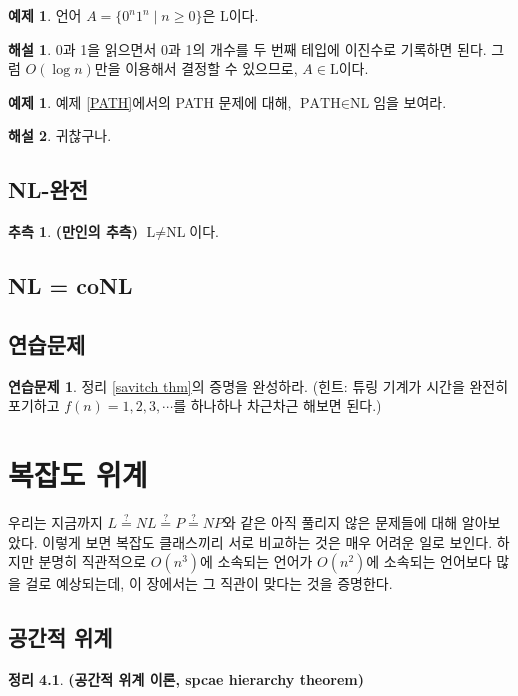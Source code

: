 \documentclass[b5paper, 11pt]{book}
\theoremstyle{definition}
\newtheorem{thm}[defn]{정리}
\newtheorem{ex}[defn]{예제}
\newtheorem{ec}{연습문제}[chapter]
\newtheorem{conj}[defn]{추측}
\newtheorem*{ans*}{해설}
\newenvironment{pf*}{\pushQED{\qed}\pf}
{\popQED\endpf}
\begin{document}
\begin{ex}
    언어 $A = \{ 0^n 1^n \;\vert\; n \ge 0\}$은 L이다.
\end{ex} 
\begin{ans*}
    0과 1을 읽으면서 0과 1의 개수를 두 번째 테입에 이진수로 기록하면 된다. 그럼 $O(\log{n})$만을 이용해서 결정할 수 있으므로, $A \in \text{L}$이다.
\end{ans*}
\begin{ex}
    예제 \ref{PATH}에서의 PATH 문제에 대해, $\text{PATH} \in \text{NL}$임을 보여라.
\end{ex}
\begin{ans*}
    귀찮구나.
\end{ans*}
\section{NL-완전}
\begin{conj}
    \textbf{(만인의 추측)} $\text{L} \neq \text{NL}$이다.
\end{conj}
\section{NL = coNL}
\section{연습문제}
\begin{ec}\label{savitch thm exec}
    정리 \ref{savitch thm}의 증명을 완성하라. (힌트: 튜링 기계가 시간을 완전히 포기하고 $f(n) = 1, 2, 3, \cdots$를 하나하나 차근차근 해보면 된다.)
\end{ec}
\chapter{복잡도 위계}
우리는 지금까지 $L \overset{?}{=} NL \overset{?}{=} P \overset{?}{=} NP$와 같은 아직 풀리지 않은 문제들에 대해 알아보았다. 이렇게 보면 복잡도 클래스끼리  서로 비교하는 것은 매우 어려운 일로 보인다. 하지만 분명히 직관적으로 $O(n^3)$에 소속되는 언어가 $O(n^2)$에 소속되는 언어보다 많을 걸로 예상되는데, 이 장에서는 그 직관이 맞다는 것을 증명한다.
\section{공간적 위계}
\begin{thm}
    \textbf{(공간적 위계 이론, spcae hierarchy theorem)}
\end{thm}
\begin{pf*}
    
\end{pf*}
\end{document}
